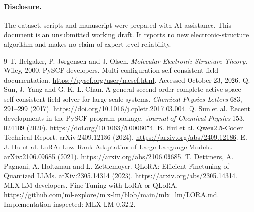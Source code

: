 \documentclass[11pt]{article}
\begin{document}
\paragraph{Disclosure.}
The dataset, scripts and manuscript were prepared with AI assistance.
This document is an unsubmitted working draft. It reports no new
electronic-structure algorithm and makes no claim of expert-level reliability.

\begingroup
\footnotesize
\begin{thebibliography}{9}
\setlength{\itemsep}{2pt}
\setlength{\parskip}{0pt}
 T. Helgaker, P. J\o rgensen and J. Olsen.
\emph{Molecular Electronic-Structure Theory}. Wiley, 2000.
 PySCF developers. Multi-configuration self-consistent field documentation.
\url{https://pyscf.org/user/mcscf.html}. Accessed October 23, 2026.
 Q. Sun, J. Yang and G. K.-L. Chan.
A general second order complete active space self-consistent-field solver for large-scale systems.
\emph{Chemical Physics Letters} 683, 291--299 (2017).
\url{https://doi.org/10.1016/j.cplett.2017.03.004}.
 Q. Sun et al. Recent developments in the PySCF program package.
\emph{Journal of Chemical Physics} 153, 024109 (2020).
\url{https://doi.org/10.1063/5.0006074}.
 B. Hui et al. Qwen2.5-Coder Technical Report.
arXiv:2409.12186 (2024). \url{https://arxiv.org/abs/2409.12186}.
 E. J. Hu et al. LoRA: Low-Rank Adaptation of Large Language Models.
arXiv:2106.09685 (2021). \url{https://arxiv.org/abs/2106.09685}.
 T. Dettmers, A. Pagnoni, A. Holtzman and L. Zettlemoyer.
QLoRA: Efficient Finetuning of Quantized LLMs.
arXiv:2305.14314 (2023). \url{https://arxiv.org/abs/2305.14314}.
 MLX-LM developers. Fine-Tuning with LoRA or QLoRA.
\url{https://github.com/ml-explore/mlx-lm/blob/main/mlx_lm/LORA.md}.
Implementation inspected: MLX-LM 0.32.2.
\end{thebibliography}
\endgroup
\end{document}
